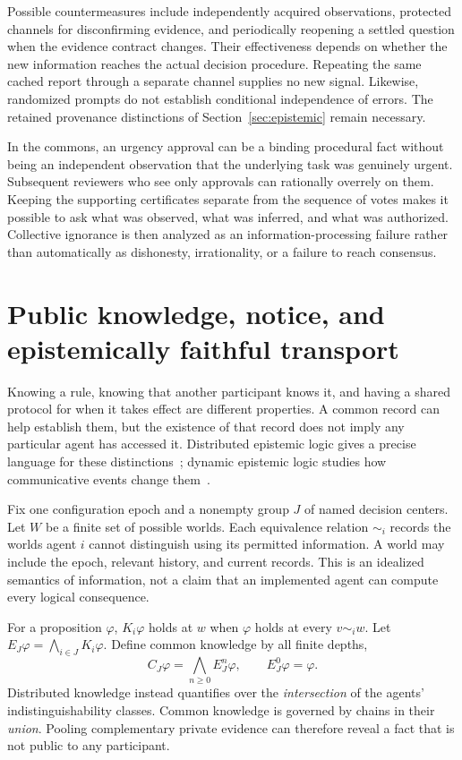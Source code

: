 \documentclass[11pt,letterpaper]{article}
\theoremstyle{plain}
\theoremstyle{definition}
\theoremstyle{remark}
\begin{document}
Possible countermeasures include independently acquired observations, protected channels for disconfirming evidence, and periodically reopening a settled question when the evidence contract changes. Their effectiveness depends on whether the new information reaches the actual decision procedure. Repeating the same cached report through a separate channel supplies no new signal. Likewise, randomized prompts do not establish conditional independence of errors. The retained provenance distinctions of Section~\ref{sec:epistemic} remain necessary.

In the commons, an urgency approval can be a binding procedural fact without being an independent observation that the underlying task was genuinely urgent. Subsequent reviewers who see only approvals can rationally overrely on them. Keeping the supporting certificates separate from the sequence of votes makes it possible to ask what was observed, what was inferred, and what was authorized. Collective ignorance is then analyzed as an information-processing failure rather than automatically as dishonesty, irrationality, or a failure to reach consensus.


\section{Public knowledge, notice, and epistemically faithful transport}\label{sec:publicknowledge}
Knowing a rule, knowing that another participant knows it, and having a shared protocol for when it takes effect are different properties. A common record can help establish them, but the existence of that record does not imply any particular agent has accessed it. Distributed epistemic logic gives a precise language for these distinctions~\cite{halpernmoses}; dynamic epistemic logic studies how communicative events change them~\cite{baltag}.

Fix one configuration epoch and a nonempty group $J$ of named decision centers. Let $W$ be a finite set of possible worlds. Each equivalence relation $\sim_i$ records the worlds agent $i$ cannot distinguish using its permitted information. A world may include the epoch, relevant history, and current records. This is an idealized semantics of information, not a claim that an implemented agent can compute every logical consequence.

For a proposition $\varphi$, $K_i\varphi$ holds at $w$ when $\varphi$ holds at every $v\sim_i w$. Let $E_J\varphi=\bigwedge_{i\in J}K_i\varphi$. Define common knowledge by all finite depths,
\[
C_J\varphi=\bigwedge_{n\ge0}E_J^n\varphi,
\qquad E_J^0\varphi=\varphi.
\]
Distributed knowledge instead quantifies over the \emph{intersection} of the agents' indistinguishability classes. Common knowledge is governed by chains in their \emph{union}. Pooling complementary private evidence can therefore reveal a fact that is not public to any participant.
\end{document}
